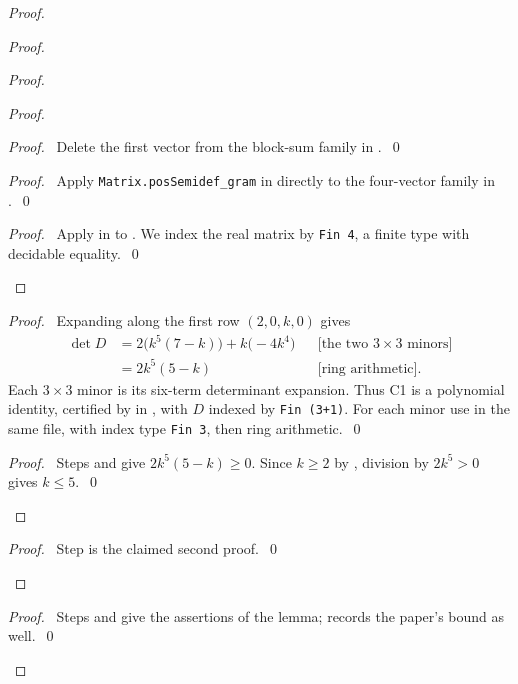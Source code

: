\begin{proof}
\begin{proof}
 \begin{proof}
  \begin{proof}
   \begin{proof}\pf\ Delete the first vector from the block-sum family in
    .~\qed\end{proof}
   \begin{proof}
    \pf\ Apply \texttt{Matrix.posSemidef\_gram} in
    directly to the four-vector family in .~\qed
   \end{proof}
   \qedstep
   \begin{proof}
    \raggedright\pf\ Apply  in
     to .
    We index the real matrix by \texttt{Fin 4}, a finite type with decidable equality.~\qed
   \end{proof}
  \end{proof}
  \label{comp:C1}
  \uses{}
  \begin{proof}
   \raggedright\pf\ Expanding along the first row $(2,0,k,0)$ gives
   \begin{align*}
    \det D&=2\bigl(k^5(7-k)\bigr)+k\bigl(-4k^4\bigr)
      &&\text{[the two $3\times3$ minors]}\\
     &=2k^5(5-k)&&\text{[ring arithmetic].}
   \end{align*}
   Each $3\times3$ minor is its six-term determinant expansion. Thus C1 is a polynomial
   identity, certified by  in
   , with $D$ indexed by
   \texttt{Fin (3+1)}. For each minor use  in the same file,
   with index type \texttt{Fin 3}, then ring arithmetic.~\qed
  \end{proof}
  \qedstep
  \begin{proof}
   \pf\ Steps  and  give $2k^5(5-k)\geq0$.
   Since $k\geq2$ by , division by $2k^5>0$ gives $k\leq5$.~\qed
  \end{proof}
 \end{proof}

  \qedstep
  \begin{proof}\pf\ Step  is the claimed second proof.~\qed\end{proof}
 \end{proof}
 \qedstep
 \begin{proof}\pf\ Steps  and  give the assertions
  of the lemma;  records the paper's bound as well.~\qed\end{proof}
\end{proof}

